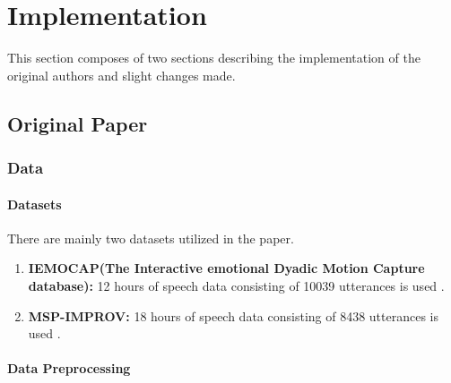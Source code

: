 \documentclass[a4paper,11pt]{article}
\begin{document}
\pagebreak

\section{Implementation} \label{sec:implementation}

This section composes of two sections describing the implementation of the original authors and slight changes made.

\subsection{Original Paper}
\subsubsection{Data} 

\paragraph{Datasets}

There are mainly two datasets utilized in the paper. 
\begin{enumerate}
    \item \textbf{IEMOCAP(The Interactive emotional Dyadic Motion Capture database):} 12 hours of speech data consisting of 10039 utterances  is used \cite{busso2008iemocap}.
    \item \textbf{MSP-IMPROV:} 18 hours of speech data consisting of 8438 utterances is used \cite{busso2016msp}.
\end{enumerate}

\paragraph{Data Preprocessing} \label{subsec:datapreprocess}
\end{document}
